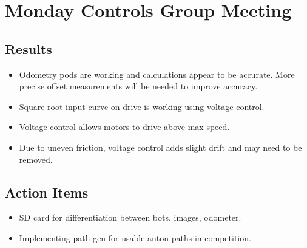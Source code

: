 \section{Monday Controls Group Meeting}

\subsection{Results}
\begin{itemize}
    \item Odometry pods are working and calculations appear to be accurate. More precise offset measurements will be needed to improve accuracy.
    \item Square root input curve on drive is working using voltage control.
    \item Voltage control allows motors to drive above max speed.
    \item Due to uneven friction, voltage control adds slight drift and may need to be removed.
\end{itemize}

\subsection{Action Items}
\begin{itemize}
    \item SD card for differentiation between bots, images, odometer.
    \item Implementing path gen for usable auton paths in competition.
\end{itemize}
